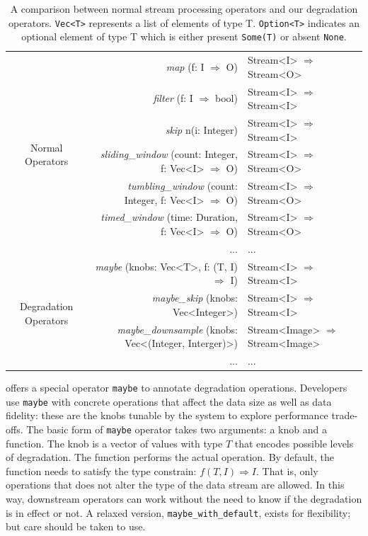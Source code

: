 \begin{table}
  \centering
  \begin{tabular}{ c r l }
    \toprule
    \multirow{7}{*}{Normal Operators}
    & \textit{map} (f: I $\Rightarrow$ O) & Stream<I> $\Rightarrow$ Stream<O> \\
    & \textit{filter} (f: I $\Rightarrow$ bool) & Stream<I> $\Rightarrow$
                                                 Stream<I> \\
    & \textit{skip} n(i: Integer) & Stream<I> $\Rightarrow$ Stream<I> \\
    & \textit{sliding\_window} (count: Integer, f: Vec<I> $\Rightarrow$ O) & Stream<I> $\Rightarrow$
                                                                            Stream<O> \\
    & \textit{tumbling\_window} (count: Integer, f: Vec<I> $\Rightarrow$ O) & Stream<I> $\Rightarrow$
                                                                             Stream<O> \\
    & \textit{timed\_window} (time: Duration, f: Vec<I> $\Rightarrow$ O) & Stream<I> $\Rightarrow$
                                                                          Stream<O> \\
    & ... & ... \\
    \midrule
    \multirow{4}{*}{Degradation Operators}
    & \textit{maybe} (knobs: Vec<T>, f:  (T, I) $\Rightarrow$ I) & Stream<I> $\Rightarrow$
                                                                 Stream<I> \\
    & \textit{maybe\_skip} (knobs: Vec<Integer>) & Stream<I> $\Rightarrow$ Stream<I> \\
    & \textit{maybe\_downsample} (knobs: Vec<(Integer, Interger)>) & Stream<Image> $\Rightarrow$ Stream<Image> \\
    & ... & ... \\
    \bottomrule
  \end{tabular}
  \caption{A comparison between normal stream processing operators and our
    degradation operators. \texttt{Vec<T>} represents a list of elements of type
    T. \texttt{Option<T>} indicates an optional element of type T which is
    either present \texttt{Some(T)} or absent \texttt{None}.}
  \label{tab:operators}
\end{table}

\sysname{} offers a special operator \texttt{maybe} to annotate degradation
operations. Developers use \texttt{maybe} with concrete operations that affect
the data size as well as data fidelity: these are the knobs tunable by the
system to explore performance trade-offs. The basic form of \texttt{maybe}
operator takes two arguments: a knob and a function. The knob is a vector of
values with type $T$ that encodes possible levels of degradation. The function
performs the actual operation. By default, the function needs to satisfy the
type constrain: $f(T, I) \Rightarrow I$. That is, only operations that does not
alter the type of the data stream are allowed. In this way, downstream operators
can work without the need to know if the degradation is in effect or not. A
relaxed version, \texttt{maybe\_with\_default}, exists for flexibility; but care
should be taken to use.

